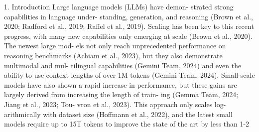 1. Introduction Large language models (LLMs) have demon- strated strong capabilities in language under- standing, generation, and reasoning (Brown et al., 2020; Radford et al., 2019; Raffel et al., 2019). Scaling has been key to this recent progress, with many new capabilities only emerging at scale (Brown et al., 2020). The newest large mod- els not only reach unprecedented performance on reasoning benchmarks (Achiam et al., 2023), but they also demonstrate multimodal and mul- tilingual capabilities (Gemini Team, 2024) and even the ability to use context lengths of over 1M tokens (Gemini Team, 2024). Small-scale models have also shown a rapid increase in performance, but these gains are largely derived from increasing the length of train- ing (Gemma Team, 2024; Jiang et al., 2023; Tou- vron et al., 2023). This approach only scales log- arithmically with dataset size (Hoffmann et al., 2022), and the latest small models require up to 15T tokens to improve the state of the art by less than 1-2%

